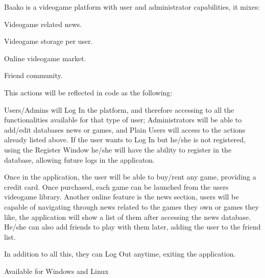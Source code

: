

Baako is a videogame platform with user and administrator capabilities, it mixes\+:
\begin{DoxyItemize}
\item Videogame related news.
\item Videogame storage per user.
\item Online videogame market.
\item Friend community.
\end{DoxyItemize}

This actions will be reflected in code as the following\+:

Users/\+Admins will Log In the platform, and therefore accessing to all the functionalities available for that type of user; Administrators will be able to add/edit database\textquotesingle{}s news or games, and Plain Users will access to the actions already listed above. If the user wants to Log In but he/she is not registered, using the Register Window he/she will have the ability to register in the database, allowing future logs in the applicaton.

Once in the application, the user will be able to buy/rent any game, providing a credit card. Once purchased, each game can be launched from the user\textquotesingle{}s videogame library. Another online feature is the news section, users will be capable of navigating through news related to the games they own or games they like, the application will show a list of them after accessing the news database. He/she can also add friends to play with them later, adding the user to the friend list.

In addition to all this, they can Log Out anytime, exiting the application.



Available for Windows and Linux 
